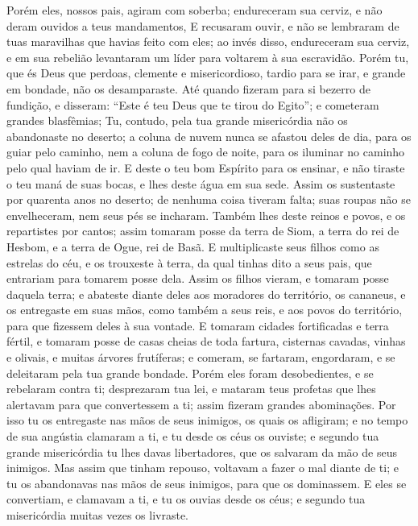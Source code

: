 {{  Porém eles, nossos pais, agiram com soberba; endureceram sua cerviz, e não deram ouvidos a teus mandamentos,
  E recusaram {} ouvir, e não se lembraram de tuas maravilhas que havias feito com eles; ao invés disso, endureceram sua cerviz, e em sua rebelião levantaram um líder para voltarem à sua escravidão. Porém tu, que és Deus que perdoas, clemente e misericordioso, tardio para se irar, e grande em bondade, não os desamparaste.
  Até quando fizeram para si bezerro de fundição, e disseram: \enquote{Este é teu Deus que te tirou do Egito}; e cometeram grandes blasfêmias;
  Tu, contudo, pela tua grande misericórdia não os abandonaste no deserto; a coluna de nuvem nunca se afastou deles de dia, para os guiar pelo caminho, nem a coluna de fogo de noite, para os iluminar no caminho pelo qual haviam de ir.
  E deste o teu bom Espírito para os ensinar, e não tiraste o teu maná de suas bocas, e lhes deste água em sua sede.
  Assim os sustentaste por quarenta anos no deserto; de nenhuma coisa tiveram falta; suas roupas não se envelheceram, nem seus pés se incharam.
  Também lhes deste reinos e povos, e os repartistes por cantos; assim tomaram posse da terra de Siom, a terra do rei de Hesbom, e a terra de Ogue, rei de Basã.
  E multiplicaste seus filhos como as estrelas do céu, e os trouxeste à terra, da qual tinhas dito a seus pais, que entrariam para tomarem posse dela.
  Assim os filhos vieram, e tomaram posse daquela terra; e abateste diante deles aos moradores do território, os cananeus, e os entregaste em suas mãos, como também a seus reis, e aos povos do território, para que fizessem deles à sua vontade.
  E tomaram cidades fortificadas e terra fértil, e tomaram posse de casas cheias de toda fartura, cisternas cavadas, vinhas e olivais, e muitas árvores frutíferas; e comeram, se fartaram, engordaram, e se deleitaram pela tua grande bondade.
  Porém eles foram desobedientes, e se rebelaram contra ti; desprezaram tua lei, e mataram teus profetas que lhes alertavam para que {} convertessem a ti; assim fizeram grandes abominações.
  Por isso tu os entregaste nas mãos de seus inimigos, os quais os afligiram; e no tempo de sua angústia clamaram a ti, e tu desde os céus os ouviste; e segundo tua grande misericórdia tu lhes davas libertadores, que os salvaram da mão de seus inimigos.
  Mas assim que tinham repouso, voltavam a fazer o mal diante de ti; e tu os abandonavas nas mãos de seus inimigos, para que os dominassem. E eles se convertiam, e clamavam a ti, e tu os ouvias desde os céus; e segundo tua misericórdia muitas vezes os livraste.
}}
